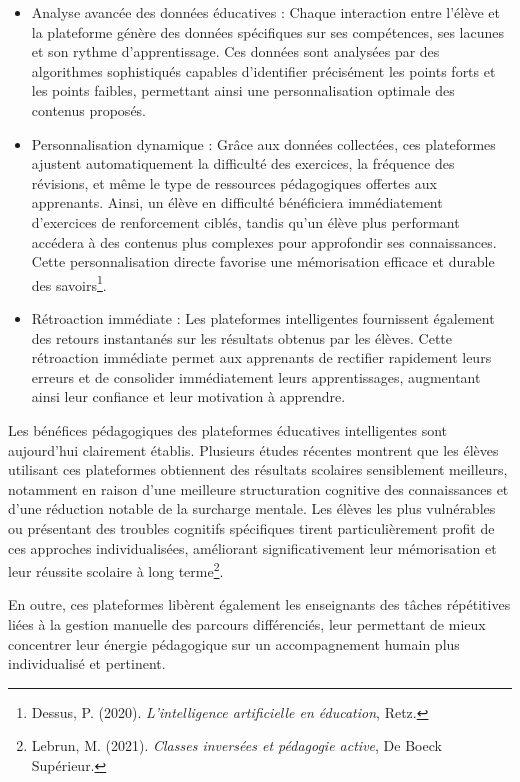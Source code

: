 \documentclass[11pt,a4paper]{report}
\begin{document}
\begin{itemize}

    \item Analyse avancée des données éducatives :
Chaque interaction entre l’élève et la plateforme génère des données spécifiques sur ses compétences, ses lacunes et son rythme d’apprentissage. Ces données sont analysées par des algorithmes sophistiqués capables d’identifier précisément les points forts et les points faibles, permettant ainsi une personnalisation optimale des contenus proposés.

    \item Personnalisation dynamique :
Grâce aux données collectées, ces plateformes ajustent automatiquement la difficulté des exercices, la fréquence des révisions, et même le type de ressources pédagogiques offertes aux apprenants. Ainsi, un élève en difficulté bénéficiera immédiatement d’exercices de renforcement ciblés, tandis qu’un élève plus performant accédera à des contenus plus complexes pour approfondir ses connaissances. Cette personnalisation directe favorise une mémorisation efficace et durable des savoirs\footnote{Dessus, P. (2020). \textit{L’intelligence artificielle en éducation}, Retz.}.

    \item Rétroaction immédiate :
Les plateformes intelligentes fournissent également des retours instantanés sur les résultats obtenus par les élèves. Cette rétroaction immédiate permet aux apprenants de rectifier rapidement leurs erreurs et de consolider immédiatement leurs apprentissages, augmentant ainsi leur confiance et leur motivation à apprendre.
\end{itemize}

Les bénéfices pédagogiques des plateformes éducatives intelligentes sont aujourd’hui clairement établis. Plusieurs études récentes montrent que les élèves utilisant ces plateformes obtiennent des résultats scolaires sensiblement meilleurs, notamment en raison d’une meilleure structuration cognitive des connaissances et d’une réduction notable de la surcharge mentale. Les élèves les plus vulnérables ou présentant des troubles cognitifs spécifiques tirent particulièrement profit de ces approches individualisées, améliorant significativement leur mémorisation et leur réussite scolaire à long terme\footnote{Lebrun, M. (2021). \textit{Classes inversées et pédagogie active}, De Boeck Supérieur.}.

En outre, ces plateformes libèrent également les enseignants des tâches répétitives liées à la gestion manuelle des parcours différenciés, leur permettant de mieux concentrer leur énergie pédagogique sur un accompagnement humain plus individualisé et pertinent.
\end{document}
